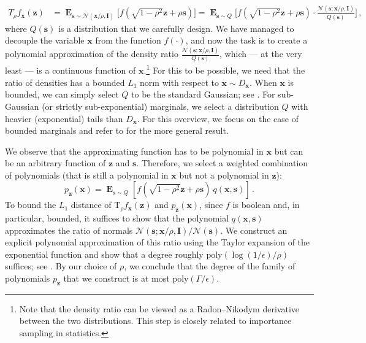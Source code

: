 \documentclass[10pt,a4paper]{article}
\renewcommand\vec[1]{\mathbf{#1}}
\DeclareMathOperator*{\E}{\mathbf{E}}
\newcommand{\1}{\Ind}
\begin{document}
\begin{align*}
T_{\rho}f_{\mathbf{x}}(\mathbf{z}) &= \E_{\vec{s}\sim \mathcal{N}(\mathbf{x}/\rho,\mathbf{I})}\bigl[f(\sqrt{1-\rho^2}\mathbf{z}+\rho\vec{s})\bigr]  
= \E_{\vec{s}\sim Q}\biggl[f(\sqrt{1-\rho^2}\mathbf{z}+\rho\vec{s}) \cdot \frac{\mathcal{N}(\vec{s};\mathbf{x}/\rho,\mathbf{I})}{Q(\vec{s})}\biggr] \,,
\end{align*} 
where $Q(\vec{s})$ is a distribution that we carefully design. We have managed to decouple  the variable $\mathbf{x}$ from the function $f(\cdot)$, and now the task is to create a polynomial approximation of the density ratio $\frac{\mathcal{N}(\vec{s};\mathbf{x}/\rho,\mathbf{I})}{Q(\vec{s})}$, which --- at the very least --- is a continuous function of $\mathbf{x}$.\footnote{Note that the density ratio can be viewed as a Radon--Nikodym derivative between the two distributions. This step is closely related to importance sampling in statistics.}
For this to be possible, we need that the ratio of densities has a bounded $L_1$ norm with respect to $\mathbf{x} \sim D_{\mathbf{x}}$. When $\mathbf{x}$ is bounded, we can simply select $Q$ to be the standard Gaussian; see . For sub-Gaussian (or strictly sub-exponential) marginals, we select a distribution $Q$ with heavier (exponential) tails than $D_{\mathbf{x}}$. For this overview, we focus on the case of bounded marginals and refer to  for the more general result.

We observe that the approximating function has to be polynomial in $\mathbf{x}$ but can be an arbitrary function of $\mathbf{z}$ and $\vec{s}$. Therefore, we select a weighted combination of polynomials (that is still a polynomial in $\mathbf{x}$ but not a polynomial in $\mathbf{z}$):
\[
p_{\mathbf{z}}(\mathbf{x}) = \E_{\vec{s}\sim Q}[f(\sqrt{1-\rho^2} \mathbf{z} + \rho \vec{s}) ~ q(\mathbf{x}, \vec{s})]
\,.
\]
To bound the $L_1$ distance of $\text{T}_\rho f_{\mathbf{x}}(\mathbf{z})$ and $p_{\mathbf{z}}(\mathbf{x})$, since $f$ is boolean and, in particular, bounded, it suffices to show that the polynomial $q(\mathbf{x}, \vec{s})$ approximates the ratio of normals $\mathcal{N}(\vec{s}; \mathbf{x}/\rho, \mathbf{I})/\mathcal{N}(\vec{s})$. We construct an explicit polynomial approximation of this ratio using the Taylor expansion of the exponential function and show that a degree roughly $\text{poly}(\log(1/\epsilon)/\rho)$ suffices; see . By our choice of $\rho$, we conclude that the degree of the family of polynomials $p_{\mathbf{z}}$ that we construct is at most $\text{poly}(\Gamma/\epsilon)$.
\end{document}
